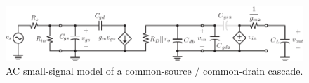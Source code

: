 \begin{figure}[tb]
\centering
\includegraphics[scale=0.95]{9cs_cd_casc_ss}
\caption{AC small-signal model of a common-source / common-drain cascade.}
\label{fig:9cs_cd_casc_ss}
\end{figure}
\section{\topicD}
